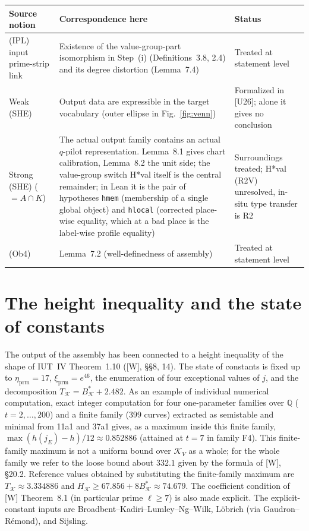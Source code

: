 \documentclass[11pt]{article}
\newcommand{\cK}{\mathcal K}
\begin{document}
\begin{center}
\begin{tabular}{p{3.4cm}p{7.2cm}p{4.2cm}}
\toprule
Source notion & Correspondence here & Status\\
\midrule
(IPL) input prime-strip link & Existence of the value-group-part
isomorphism in Step~(i) (Definitions~3.8, 2.4) and its degree
distortion (Lemma~7.4) & Treated at statement level\\
Weak (SHE) & Output data are expressible in the target vocabulary
(outer ellipse in Fig.~\ref{fig:venn}) & Formalized in [U26]; alone
it gives no conclusion\\
Strong (SHE) ($=A\cap K$) & The actual output family contains an
actual $q$-pilot representation.  Lemma~8.1 gives chart
calibration, Lemma~8.2 the unit side; the value-group switch H*val
itself is the central remainder; in Lean it is the pair of hypotheses
\texttt{hmem} (membership of a single global object) and
\texttt{hlocal} (corrected place-wise equality, which at a bad place
is the label-wise profile equality) & Surroundings treated; H*val (R2V)
unresolved, in-situ type transfer is R2\\
(Ob4) & Lemma~7.2 (well-definedness of assembly) & Treated at
statement level\\
\bottomrule
\end{tabular}
\end{center}

\section{The height inequality and the state of constants}

The output of the assembly has been connected to a height
inequality of the shape of IUT~IV Theorem~1.10 ([W], \S\S8, 14).
The state of constants is fixed up to
$\eta_{\mathrm{prm}}=17$, $\xi_{\mathrm{prm}}=e^{46}$, the
enumeration of four exceptional values of $j$, and the
decomposition $T_{\cK}=B_{\cK}^{*}+2.482$.  As an example of
individual numerical computation, exact integer computation for
four one-parameter families over $\mathbb Q$ ($t=2,\dots,200$) and
a finite family (399 curves) extracted as semistable and minimal
from 11a1 and 37a1 gives, as a maximum inside this finite family,
$\max (h(j_E)-h)/12\approx0.852886$ (attained at $t=7$ in family
F4).  This finite-family maximum is not a uniform bound over
$\cK_V$ as a whole; for the whole family we refer to the loose
bound about $332.1$ given by the formula of [W], \S20.2.
Reference values obtained by substituting the finite-family maximum
are $T_{\cK}\approx3.334886$ and
$H_{\cK}\ge67.856+8B_{\cK}^{*}\approx74.679$.  The coefficient
condition of [W] Theorem~8.1 (in particular prime $\ell\ge7$) is
also made explicit.  The explicit-constant inputs are
Broadbent--Kadiri--Lumley--Ng--Wilk, L\"obrich (via
Gaudron--R\'emond), and Sijsling.
\end{document}

